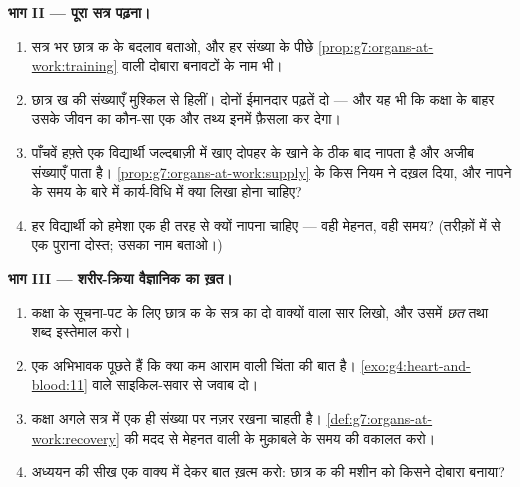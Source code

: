 \begin{problem}
\medskip\noindent\textbf{भाग II --- पूरा सत्र पढ़ना।}
\begin{enumerate}[resume]
  \item सत्र भर छात्र क के बदलाव बताओ, और हर संख्या के पीछे
        \cref{prop:g7:organs-at-work:training} वाली दोबारा बनावटों के
        नाम भी।
  \item छात्र ख की संख्याएँ मुश्किल से हिलीं। दोनों ईमानदार पढ़तें दो
        --- और यह भी कि कक्षा के बाहर उसके जीवन का कौन-सा एक और तथ्य
        इनमें फ़ैसला कर देगा।
  \item पाँचवें हफ़्ते एक विद्यार्थी जल्दबाज़ी में खाए दोपहर के खाने के
        ठीक बाद नापता है और अजीब संख्याएँ पाता है।
        \cref{prop:g7:organs-at-work:supply} के किस नियम ने दख़ल दिया,
        और नापने के समय के बारे में कार्य-विधि में क्या लिखा होना
        चाहिए?
  \item हर विद्यार्थी को हमेशा एक ही तरह से क्यों नापना चाहिए --- वही
        मेहनत, वही समय? (तरीक़ों में से एक पुराना दोस्त; उसका नाम बताओ।)
\end{enumerate}

\medskip\noindent\textbf{भाग III --- शरीर-क्रिया वैज्ञानिक का ख़त।}
\begin{enumerate}[resume]
  \item कक्षा के सूचना-पट के लिए छात्र क के सत्र का दो वाक्यों वाला
        सार लिखो, और उसमें \emph{छत} तथा \emph{} शब्द इस्तेमाल
        करो।
  \item एक अभिभावक पूछते हैं कि क्या कम आराम वाली  चिंता की बात
        है। \cref{exo:g4:heart-and-blood:11} वाले साइकिल-सवार से जवाब
        दो।
  \item कक्षा अगले सत्र में एक ही संख्या पर नज़र रखना चाहती है।
        \cref{def:g7:organs-at-work:recovery} की मदद से मेहनत वाली
         के मुक़ाबले  के समय की वकालत करो।
  \item अध्ययन की सीख एक वाक्य में देकर बात ख़त्म करो: छात्र क की मशीन
        को किसने दोबारा बनाया?
\end{enumerate}
\end{problem}
